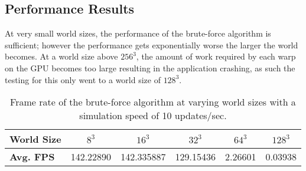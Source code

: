 \subsection{Performance Results}
At very small world sizes, the performance of the brute-force algorithm is sufficient; however the performance gets
exponentially worse the larger the world becomes. At a world size above \(256^3\), the amount of work required by each
warp on the GPU becomes too large resulting in the application crashing, as such the testing for this only went to a
world size of \(128^3\).

\begin{table}[h!]
    \centering
    \vspace{0.5em}
    \begin{tabular}{l|*{5}{c}}
        \toprule
        \textbf{World Size} & \textbf{\(8^3\)} & \textbf{\(16^3\)} & \textbf{\(32^3\)} & \textbf{\(64^3\)} & \textbf{\(128^3\)} \\
        \midrule
        \textbf{Avg. FPS}   & 142.22890        & 142.335887        & 129.15436         & 2.26601           & 0.03938            \\
        \bottomrule
    \end{tabular}
    \caption{Frame rate of the brute-force algorithm at varying world sizes with a simulation speed of 10 updates/sec.}
\end{table}

\begin{table}[h!]
    \centering
    \vspace{0.5em}
    \caption{Distance field compute shader execution time using the brute-force algorithm.}
    \label{tab:brute_force}
\end{table}

